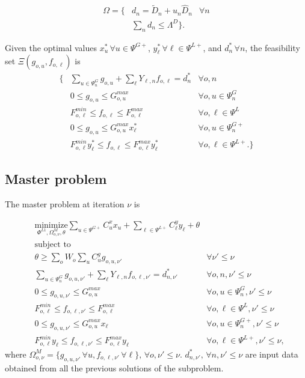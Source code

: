 \begin{align}
\Omega = \{ &d_n = \tilde{D}_n + u_n \hat{D}_n & \forall n \nonumber \\
\label{uncertainty_set}&\sum\limits_n d_n \leq \Lambda^D \}.
\end{align}

Given the optimal values $x_u^* \, \forall u \in \Psi^{G+}$, $y_\ell^* \, \forall \ell \in \Psi^{L+}$, and $d_n^* \, \forall n$, the feasibility set $\Xi(g_{o, u}, f_{o, \ell})$ is
\begin{align}
\{ &\sum\limits_{u \in \Psi^G_{n}} g_{o, u} + \sum\limits_{\ell} Y_{\ell, n} f_{o, \ell} = d_{n}^* & \forall o, n\\
&0 \leq g_{o, u} \leq G_{o, u}^{max} & \forall o, u \in \Psi_n^G\\
&F_{o, \ell}^{min} \leq f_{o, \ell} \leq F_{o, \ell}^{max} & \forall o, \ell \in \Psi^L \\
&0 \leq g_{o, u} \leq G_{o, u}^{max} x_\ell^* & \forall o, u \in \Psi_n^{G+} \\
&F_{o, \ell}^{min} y_\ell^* \leq f_{o, \ell} \leq F_{o, \ell}^{max} y_\ell^* & \forall o, \ell \in \Psi^{L+}. \}
\end{align}

\subsection{Master problem}

The master problem at iteration $\nu$ is

\begin{align}
&\label{master_obj} \underset{\Phi^{L1}, \Omega_{o, \nu}^{M}, \theta}{\text{minimize}} \sum\limits_{u \in \Psi^{G+}} C^x_{u} x_{u} + \sum\limits_{\ell \in \Psi^{L+}} C^y_{\ell} y_{\ell} + \theta \\
&\text{subject to} \nonumber \\
&\theta \geq \sum\limits_o W_o \sum\limits_{u} C_u^g g_{o, u, \nu'} & \forall \nu' \leq \nu \\
&\sum\limits_{u \in \Psi^G_{n}} g_{o, u, \nu'} + \sum\limits_{\ell} Y_{\ell, n} f_{o, \ell, \nu'} = d_{n, \nu'}^* & \forall o, n, \nu' \leq \nu \\
&0 \leq g_{o, u, \nu'} \leq G_{o, u}^{max} & \forall o, u \in \Psi_n^G, \nu' \leq \nu \\
&F_{o, \ell}^{min} \leq f_{o, \ell, \nu'} \leq F_{o, \ell}^{max} & \forall o, \ell \in \Psi^L, \nu' \leq \nu \\
&0 \leq g_{o, u, \nu'} \leq G_{o, u}^{max} x_\ell & \forall o, u \in \Psi_n^{G+}, \nu' \leq \nu \\
&F_{o, \ell}^{min} y_\ell \leq f_{o, \ell, \nu'} \leq F_{o, \ell}^{max} y_\ell & \forall o, \ell \in \Psi^{L+}, \nu' \leq \nu,
\end{align}
where $\Omega_{o, \nu}^{M} = \{g_{o,u,\nu'} \, \forall u, f_{o, \ell, \nu'} \, \forall \ell \}, \, \forall o, \nu' \leq \nu$. $d_{n, \nu'}^*, \, \forall n, \nu' \leq \nu$ are input data obtained from all the previous solutions of the subproblem.

